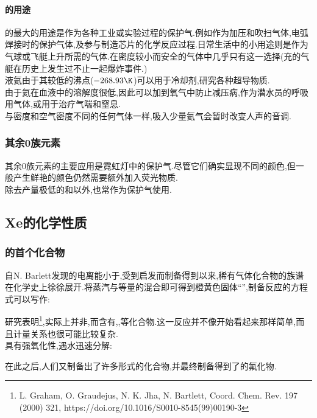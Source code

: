 \documentclass{ctexart}
\begin{document}
\paragraph{的用途}
\indent {}的最大的用途是作为各种工业或实验过程的保护气.例如作为加压和吹扫气体,电弧焊接时的保护气体,及参与制造芯片的化学反应过程.日常生活中的小用途则是作为气球或飞艇上升所需的气体.在密度较小而安全的气体中几乎只有这一选择(充的气艇在历史上发生过不止一起爆炸事件.)\\
\indent 液氦由于其较低的沸点($-268.93\K$)可以用于冷却剂,研究各种超导物质.\\
\indent 由于氦在血液中的溶解度很低,因此可以加到氧气中防止减压病,作为潜水员的呼吸用气体,或用于治疗气喘和窒息.\\
\indent 与密度和空气密度不同的任何气体一样,吸入少量氦气会暂时改变人声的音调.
\subsubsection{其余0族元素}
其余0族元素的主要应用是霓虹灯中的保护气.尽管它们确实显现不同的颜色,但一般产生鲜艳的颜色仍然需要额外加入荧光物质.\\
\indent 除去产量极低的和以外,也常作为保护气使用.
\subsection{Xe的化学性质}
\subsubsection{的首个化合物}
自N. Barlett发现的电离能小于,受到启发而制备得到以来,稀有气体化合物的族谱在化学史上徐徐展开.将蒸汽与等量的混合即可得到橙黄色固体“”,制备反应的方程式可以写作:
\begin{center}
\end{center}
\indent 研究表明\footnote{L. Graham, O. Graudejus, N. K. Jha, N. Bartlett, Coord. Chem. Rev. 197 (2000) 321, https://doi.org/10.1016/S0010-8545(99)00190-3},实际上并非\ce{[Xe]+[PtF6]-},而含有\ce{[XeF]+[PtF6]-},\ce{[XeF]+[Pt2F11]-},\ce{[Xe2F3]+[PtF6]-}等化合物.这一反应并不像开始看起来那样简单,而且计量关系也很可能比较复杂.\\
\indent {}具有强氧化性,遇水迅速分解:
\begin{center}
\end{center}
在此之后,人们又制备出了许多形式的化合物,并最终制备得到了的氟化物.
\end{document}
